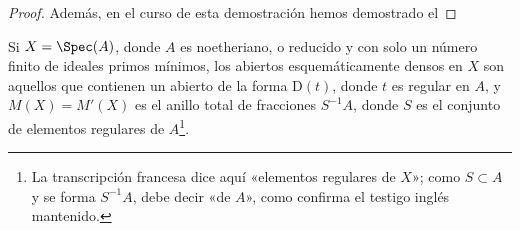 \begin{proof}
Además, en el curso de esta demostración hemos demostrado el
\end{proof}

\begin{corollary}[20.2.12]
\label{IV.20.2.12}
Si $X=\Spec(A)$, donde $A$ es noetheriano, o reducido y con solo un número finito de ideales primos mínimos, los abiertos esquemáticamente densos en $X$ son aquellos que contienen un abierto de la forma $\mathrm{D}(t)$, donde $t$ es regular en $A$, y $M(X)=M'(X)$ es el anillo total de fracciones $S^{-1}A$, donde $S$ es el conjunto de elementos regulares de $A$\footnote{La transcripción francesa dice aquí «elementos regulares de $X$»; como $S\subset A$ y se forma $S^{-1}A$, debe decir «de $A$», como confirma el testigo inglés mantenido.}.
\end{corollary}

